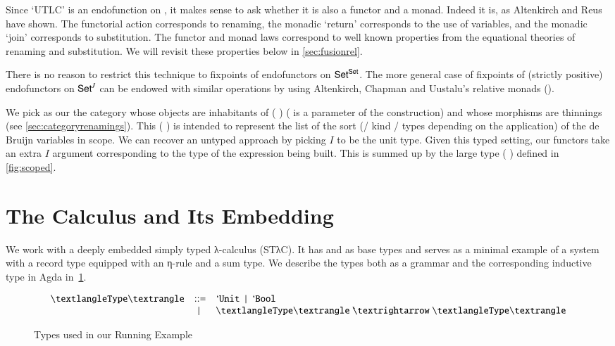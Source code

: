 Since `UTLC' is an endofunction on , it makes sense to ask whether it is
also a functor and a monad. Indeed it is, as Altenkirch and Reus have shown. The
functorial action corresponds to renaming, the monadic `return' corresponds to
the use of variables, and the monadic `join' corresponds to substitution. The
functor and monad laws correspond to well known properties from the equational
theories of renaming and substitution. We will revisit these properties
below in \cref{sec:fusionrel}.

There is no reason to restrict this technique to fixpoints of endofunctors on
$\AD{Set}^{\AD{Set}}$. The more general case of fixpoints of (strictly positive)
endofunctors on $\AD{Set}^{\AB{J}}$ can be endowed with similar operations by
using Altenkirch, Chapman and Uustalu's relative monads
(\citeyear{Altenkirch2010, JFR4389}).

We pick as our  the category whose objects are inhabitants of
({ }) ( is a parameter of the construction) and whose morphisms
are thinnings (see \cref{sec:categoryrenamings}).  This ({ }) is
intended to represent the list of the sort (/ kind / types depending on the
application) of the de Bruijn variables in scope. We can recover an untyped
approach by picking $I$ to be the unit type. Given this typed setting, our functors
take an extra $I$ argument corresponding to the type of the expression being built.
This is summed up by the large type ({ }) defined in
\cref{fig:scoped}.

\section{The Calculus and Its Embedding}
\label{sec:stlccalculus}

We work with a deeply embedded simply typed λ-calculus (STλC). It has \unit{} and
\bool{} as base types and serves as a minimal example of a system with a record
type equipped with an η-rule and a sum type. We describe the types both as a
grammar and the corresponding inductive type in Agda in~\cref{fig:type}.

\begin{figure}[h]
\begin{minipage}{0.5\textwidth}
\[
\begin{array}{lcl}
\nonterminal{\type{}}
  & ::=    & \unit{}
  ~ \mid{} ~ \bool{} \\
  & \mid{} & \arrow{\nonterminal{\type{}}}{\nonterminal{\type{}}}
\end{array}
\]
\end{minipage}
\begin{minipage}{0.5\textwidth}
\end{minipage}
\caption{Types used in our Running Example\label{fig:type}}
\end{figure}

